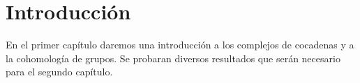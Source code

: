 \chapter{Introducción}


En el primer capítulo daremos una introducción a los complejos de cocadenas y a la cohomología de grupos. Se probaran diversos resultados que serán necesario para el segundo capítulo.
